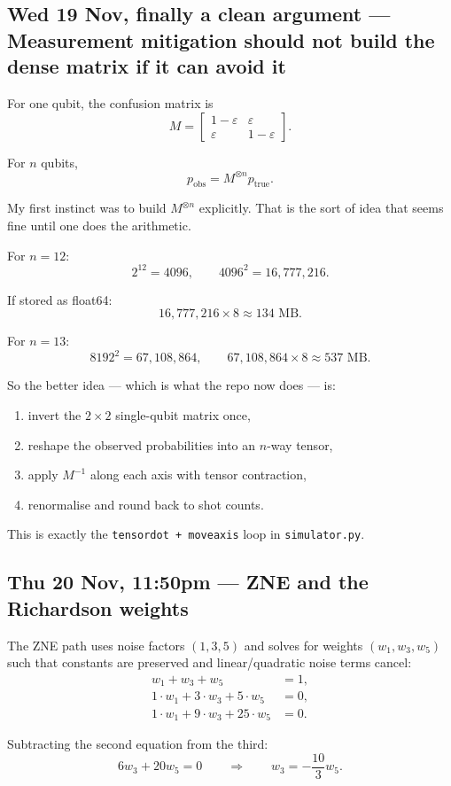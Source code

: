 \documentclass[11pt]{article}
\newcommand{\entry}[2]{\subsection*{#1 --- #2}}
\newcommand{\repo}[1]{\texttt{#1}}
\begin{document}
\entry{Wed 19 Nov, finally a clean argument}{Measurement mitigation should not build the dense matrix if it can avoid it}

For one qubit, the confusion matrix is
\[
M =
\begin{bmatrix}
1-\varepsilon & \varepsilon \\
\varepsilon & 1-\varepsilon
\end{bmatrix}.
\]

For \(n\) qubits,
\[
p_{\text{obs}} = M^{\otimes n} p_{\text{true}}.
\]

My first instinct was to build \(M^{\otimes n}\) explicitly.
That is the sort of idea that seems fine until one does the arithmetic.

For \(n=12\):
\[
2^{12} = 4096,
\qquad
4096^2 = 16{,}777{,}216.
\]

If stored as float64:
\[
16{,}777{,}216 \times 8 \approx 134 \text{ MB}.
\]

For \(n=13\):
\[
8192^2 = 67{,}108{,}864,
\qquad
67{,}108{,}864 \times 8 \approx 537 \text{ MB}.
\]

So the better idea --- which is what the repo now does --- is:
\begin{enumerate}[leftmargin=1.4em]
\item invert the \(2\times 2\) single-qubit matrix once,
\item reshape the observed probabilities into an \(n\)-way tensor,
\item apply \(M^{-1}\) along each axis with tensor contraction,
\item renormalise and round back to shot counts.
\end{enumerate}

This is exactly the \repo{tensordot + moveaxis} loop in \repo{simulator.py}.

\entry{Thu 20 Nov, 11:50pm}{ZNE and the Richardson weights}

The ZNE path uses noise factors \((1,3,5)\) and solves for weights
\((w_1,w_3,w_5)\) such that constants are preserved and linear/quadratic noise terms cancel:
\begin{align*}
w_1 + w_3 + w_5 &= 1, \\
1\cdot w_1 + 3\cdot w_3 + 5\cdot w_5 &= 0, \\
1\cdot w_1 + 9\cdot w_3 + 25\cdot w_5 &= 0.
\end{align*}

Subtracting the second equation from the third:
\[
6w_3 + 20w_5 = 0
\qquad \Rightarrow \qquad
w_3 = -\frac{10}{3}w_5.
\]
\end{document}
